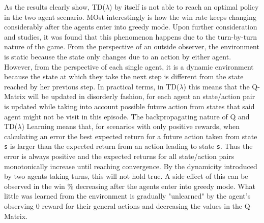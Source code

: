 \documentclass[10pt]{article}
\begin{document}
    As the results clearly show, TD($\lambda$) by itself is not able to reach an optimal policy in the two agent scenario. MOst interestingly is how the win rate keeps changing considerably after the agents enter into greedy mode. Upon further consideration and studies, it was found that this phenomenon happens due to the turn-by-turn nature of the game. From the perspective of an outside observer, the environment is static because the state only changes due to an action by either agent. However, from the perspective of each single agent, it is a dynamic environment because the state at which they take the next step is different from the state reached by her previous step. In practical terms, in TD($\lambda$) this means that the Q-Matrix will be updated in disorderly fashion, for each agent an state/action pair is updated while taking into account possible future action from states that said agent might not be visit in this episode. The backpropagating nature of Q and TD($\lambda$) Learning means that, for scenarios with only positive rewards, when calculating an error the best expected return for a future action taken from state \texttt{s} is larger than the expected return from an action leading to state \texttt{s}. Thus the error is always positive and the expected returns for all state/action pairs monotonically increase until reaching convergence. By the dynamicity introduced by two agents taking turns, this will not hold true. A side effect of this can be observed in the win \% decreasing after the agents enter into greedy mode. What little was learned from the environment is gradually "unlearned" by the agent's observing 0 reward for their general actions and decreasing the values in the Q-Matrix.
\end{document}

